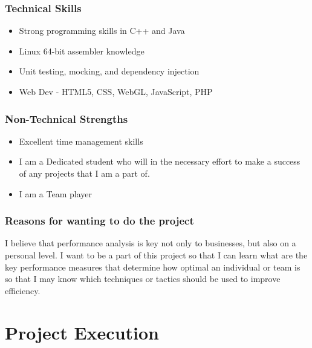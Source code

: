 \documentclass[a4paper,12pt]{article}
\begin{document}
\subsubsection{Technical Skills}
\begin{itemize}
    \item Strong programming skills in C++ and Java
    \item Linux 64-bit assembler knowledge
    \item Unit testing, mocking, and dependency injection
    \item Web Dev - HTML5, CSS, WebGL, JavaScript, PHP
\end{itemize}
\subsubsection{Non-Technical Strengths}
\begin{itemize}
    \item Excellent time management skills
    \item I am a Dedicated student who will in the necessary effort to make a success of any projects that I am a part of.
    \item I am a Team player
\end{itemize}
\subsubsection{Reasons for wanting to do the project}
I believe that performance analysis is key not only to businesses, but also on a personal level. I want to be a part of this project so that I can learn what are the key performance measures that determine how optimal an 
individual or team is so that I may know which techniques or tactics should be used to improve efficiency.
\newpage
\section{Project Execution}
\end{document}
